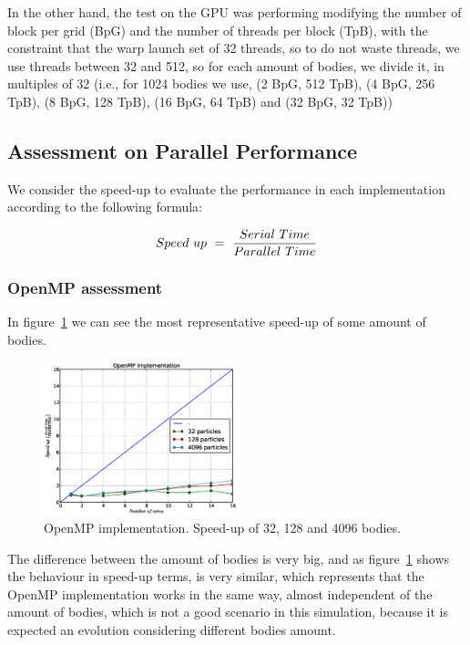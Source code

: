 In the other hand,
the test on the GPU was performing modifying the number of block per grid (BpG)
and the number of threads per block (TpB), with the constraint
that the warp launch set of 32 threads, so to do not waste threads,
we use threads between 32 and 512, so for each amount of bodies,
we divide it, in multiples of 32 (i.e., for 1024 bodies we use,
(2 BpG, 512 TpB), (4 BpG, 256 TpB), (8 BpG, 128 TpB), (16 BpG, 64 TpB) and
(32 BpG, 32 TpB)) 

\subsection{Assessment on Parallel Performance}

We consider the speed-up to evaluate the performance
in each implementation according to the following formula:

\begin{equation}
Speed\  up\ =\ \frac{Serial\ Time}{Parallel\ Time} \\
\end{equation}

\subsubsection{OpenMP assessment}

In figure~\ref{fig:openmp} we can see the most representative speed-up of some
amount of bodies.

\begin{figure}[h!t]
    \centering
    \includegraphics[width=0.5\textwidth]{images/openmp.eps}
    \caption{OpenMP implementation. Speed-up of 32, 128 and 4096 bodies.}
    \label{fig:openmp}
\end{figure}

The difference between the amount of bodies is very big,
and as figure~\ref{fig:openmp} shows the behaviour in speed-up terms,
is very similar, which represents that the OpenMP implementation works
in the same way, almost independent of the amount of bodies, which is not
a good scenario in this simulation, because it is expected an evolution
considering different bodies amount.

